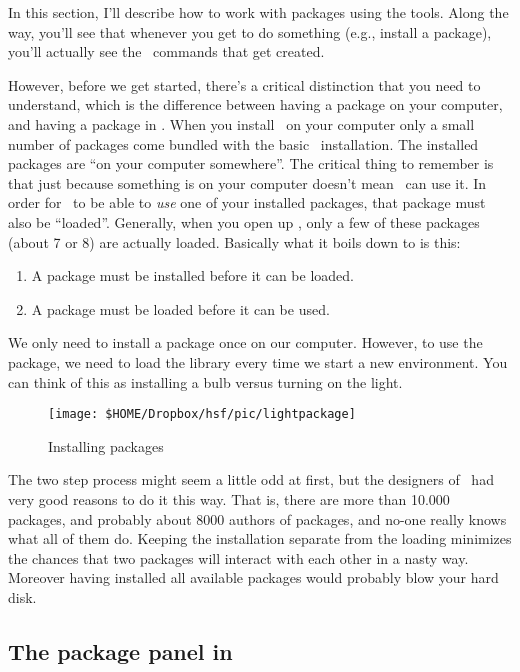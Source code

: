 In this section, I'll describe how to work with packages using the \Rstudio tools. Along the way, you'll see that whenever you get \Rstudio to do something (e.g., install a package), you'll actually see the \R\ commands that get created.

However, before we get started, there's a critical distinction that you need to understand, which is the difference between having a package  on your computer, and having a package  in \R. When you install \R\ on your computer only a small number of packages come bundled with the basic \R\ installation. The installed packages are ``on your computer somewhere''. The critical thing to remember is that just because something is on your computer doesn't mean \R\ can use it. In order for \R\ to be able to {\it use} one of your installed packages, that package must also be ``loaded''. Generally, when you open up \R, only a few of these packages (about 7 or 8) are actually loaded. Basically what it boils down to is this:
\begin{enumerate}
\item A package must be installed before it can be loaded.
\item A package must be loaded before it can be used.
\end{enumerate}
We only need to install a package once on our computer. However, to use the package, we need to load the library every time we start a new \R environment. You can think of this as installing a bulb versus turning on the light.

\begin{figure}
	\centering
	\texttt{[image: \$HOME/Dropbox/hsf/pic/lightpackage]}
	\caption{Installing packages}
	\label{fig:lightpackage}
\end{figure}


The two step process might seem a little odd at first, but the designers of \R\ had very good reasons to do it this way. That is, there are more than 10.000 packages, and probably about 8000 authors of packages, and no-one really knows what all of them do. Keeping the installation separate from the loading minimizes the chances that two packages will interact with each other in a nasty way. Moreover having installed all available packages would probably blow your hard disk.

\subsection{The package panel in \Rstudio}

